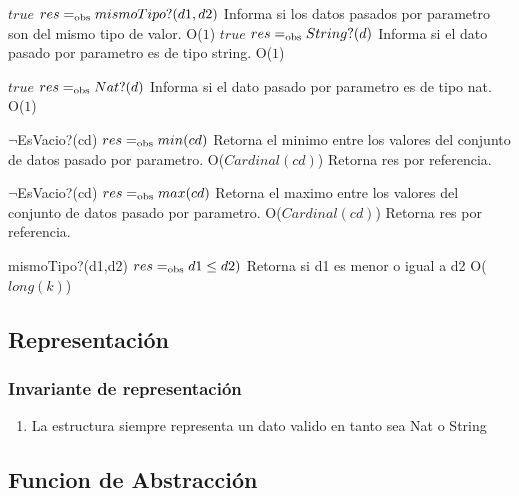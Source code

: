 
 {$true$}
 {$res =_{\mathrm{obs}} mismoTipo?(d1,d2)$}
 {Informa si los datos pasados por parametro son del mismo tipo de valor.}
 {O($1$)}
 {} 
\newpage
 {$true$}
 {$res =_{\mathrm{obs}} String?(d)$}
 {Informa si el dato pasado por parametro es de tipo string.}
 {O($1$)}
 {} 
 
 {$true$}
 {$res =_{\mathrm{obs}} Nat?(d)$}
 {Informa si el dato pasado por parametro es de tipo nat.}
 {O($1$)}
 {}  
 
 {$\neg$EsVacio?(cd)}
 {$res =_{\mathrm{obs}} min(cd)$}
 {Retorna el minimo entre los valores del conjunto de datos pasado por parametro.}
 {O($Cardinal(cd)$)}
 {Retorna res por referencia.}

 {$\neg$EsVacio?(cd)}
 {$res =_{\mathrm{obs}} max(cd)$}
 {Retorna el maximo entre los valores del conjunto de datos pasado por parametro.}
 {O($Cardinal(cd)$)}
 {Retorna res por referencia.}

 {mismoTipo?(d1,d2)}
 {$res =_{\mathrm{obs}} d1 \leq d2)$}
 {Retorna si d1 es menor o igual a d2}
 {O($long(k)$)}
 {}

\subsection{Representación}


\subsubsection*{Invariante de representación}

\begin{enumerate}
  \item La estructura siempre representa un dato valido en tanto \alpha sea Nat o String
\end{enumerate}


\newpage
\subsection*{Funcion de Abstracción}

